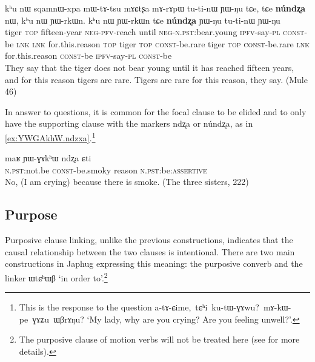 \documentclass[oldfontcommands,oneside,a4paper,11pt]{article}
\newcommand{\ipa}[1]{{\phon \mbox{#1}}} %
\begin{document}
\begin{exe}
\ex \label{ex:sqamnWxpa.mWtAtsu}
\gll
\ipa{kʰu}  	\ipa{nɯ}  	\ipa{sqamnɯ-xpa}  	\ipa{mɯ-tɤ-tsu}  	\ipa{mɤɕtʂa}  	\ipa{mɤ-rɤpɯ}  	\ipa{tu-ti-nɯ}  	\ipa{ɲɯ-ŋu}  	\ipa{tɕe,}  	\ipa{tɕe}  	\textbf{\ipa{núndʐa}}  	\ipa{nɯ,}  	\ipa{kʰu}  	\ipa{nɯ}  	\ipa{ɲɯ-rkɯn.}  	\ipa{kʰu}  	\ipa{nɯ}  	\ipa{ɲɯ-rkɯn}  	\ipa{tɕe}  	\textbf{\ipa{núndʐa}}  	\ipa{ɲɯ-ŋu}  	\ipa{tu-ti-nɯ}  	\ipa{ɲɯ-ŋu}  \\
tiger \textsc{top} fifteen-year \textsc{neg-pfv}-reach until \textsc{neg-n.pst}:bear.young \textsc{ipfv}-say-\textsc{pl} \textsc{const}-be \textsc{lnk} \textsc{lnk} for.this.reason \textsc{top} tiger \textsc{top} \textsc{const}-be.rare tiger \textsc{top} \textsc{const}-be.rare \textsc{lnk} for.this.reason \textsc{const}-be \textsc{ipfv}-say-\textsc{pl} \textsc{const}-be
\\
\glt They say that the tiger does not bear young until it has reached fifteen years, and for this reason tigers are rare. Tigers are rare for this reason, they say. (Mule 46)
\end{exe} 
In answer to questions, it is common for the focal clause to be elided and to only have the supporting clause with the markers \ipa{ndʐa} or \ipa{núndʐa}, as in \ref{ex:YWGAkhW.ndzxa}.\footnote{This is the response to the question \ipa{a-tɤ-ɕime, tɕʰi ku-tɯ-ɣɤwu? mɤ-kɯ-pe ɣɤʑu ɯβrɤŋu?} `My lady, why are you crying? Are you feeling unwell?'.}

\begin{exe}
\ex \label{ex:YWGAkhW.ndzxa}
\gll
\ipa{maʁ}   	\ipa{ɲɯ-ɣɤkʰɯ}   	\ipa{ndʐa}   	\ipa{ɕti}   \\
\textsc{n.pst}:not.be \textsc{const}-be.smoky reason \textsc{n.pst}:be:\textsc{assertive} \\
\glt No, (I am crying) because there is smoke. (The three sisters, 222) 
\end{exe} 
 



\subsection{Purpose} \label{sec:purposive}

Purposive clause linking, unlike the previous constructions, indicates that the causal relationship between the two clauses is intentional. There are two main constructions in Japhug expressing this meaning: the purposive converb and the linker \ipa{ɯtɕʰɯβ} `in order to'.\footnote{The purposive clause of motion verbs will not be treated here (see \citet{jacques13harmonization} for more details).
}
\end{document}
